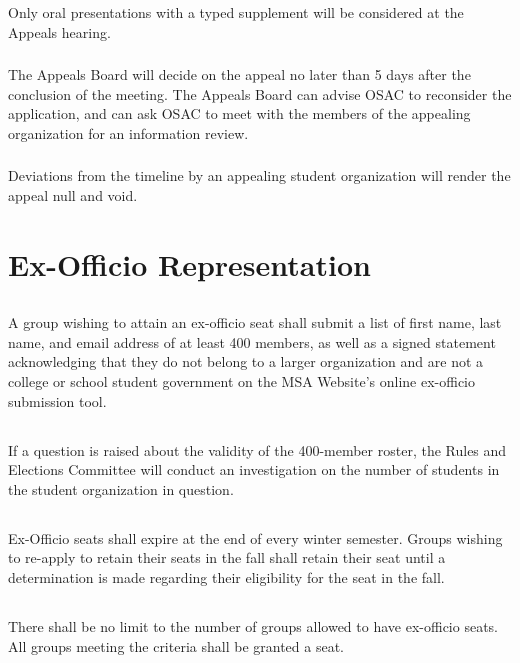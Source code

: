 \subsubsection{}
Only oral presentations with a typed supplement will be considered at the Appeals hearing.
\subsubsection{}
The Appeals Board will decide on the appeal no later than 5 days after the conclusion of the meeting.  The Appeals Board can advise OSAC to reconsider the application, and can ask OSAC to meet with the members of the appealing organization for an information review.
\subsubsection{}
Deviations from the timeline by an appealing student organization will render the appeal null and void.

\section{Ex-Officio Representation}
\subsection{}
A group wishing to attain an ex-officio seat shall submit a list of first name, last name, and email address of at least 400 members, as well as a signed statement acknowledging that they do not belong to a larger organization and are not a college or school student government on the MSA Website's online ex-officio submission tool.
\subsection{}
If a question is raised about the validity of the 400-member roster, the Rules and Elections Committee will conduct an investigation on the number of students in the student organization in question.
\subsection{}
Ex-Officio seats shall expire at the end of every winter semester. Groups wishing to re-apply to retain their seats in the fall shall retain their seat until a determination is made regarding their eligibility for the seat in the fall.
\subsection{}
There shall be no limit to the number of groups allowed to have ex-officio seats. All groups meeting the criteria shall be granted a seat.
